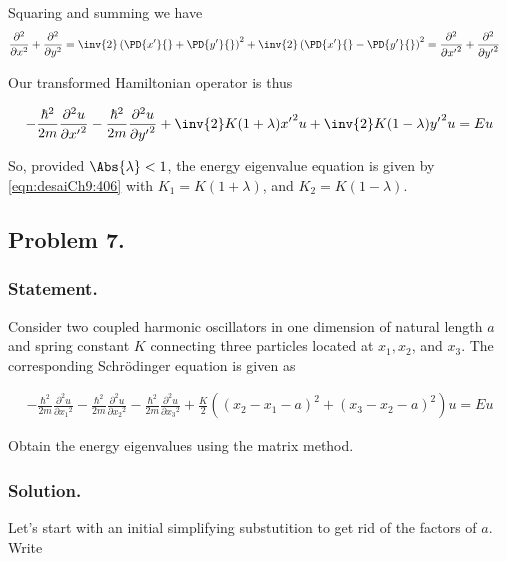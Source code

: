 Squaring and summing we have
\begin{align}\label{eqn:desaiCh9:505}
\frac{\partial^2}{\partial x^2} +
\frac{\partial^2}{\partial y^2}
&=
\inv{2} \left( \PD{x'}{} + \PD{y'}{} \right)^2
+\inv{2} \left( \PD{x'}{} - \PD{y'}{} \right)^2
=
\frac{\partial^2}{\partial {x'}^2} +
\frac{\partial^2}{\partial {y'}^2}
\end{align}

Our transformed Hamiltonian operator is thus

\begin{align}\label{eqn:desaiCh9:506}
-\frac{\hbar^2}{2m} \frac{\partial^2 u}{\partial {x'}^2}
-\frac{\hbar^2}{2m} \frac{\partial^2 u}{\partial {y'}^2}
+ \inv{2} K(1+\lambda) {x'}^2 u
+ \inv{2} K(1-\lambda) {y'}^2 u
= E u
\end{align}

So, provided $\Abs{\lambda} < 1$, the energy eigenvalue equation is given by \ref{eqn:desaiCh9:406} with $K_1 = K(1+ \lambda)$, and $K_2 = K(1 -\lambda)$.

\subsection{Problem 7.}
\subsubsection{Statement.}

Consider two coupled harmonic oscillators in one dimension of natural length $a$ and spring constant $K$ connecting three particles located at $x_1, x_2$, and $x_3$.  The corresponding Schr\"{o}dinger equation is given as

\begin{align}\label{eqn:desaiCh9:700}
-\frac{\hbar^2}{2m} \frac{\partial^2 u}{\partial {x_1}^2}
-\frac{\hbar^2}{2m} \frac{\partial^2 u}{\partial {x_2}^2}
-\frac{\hbar^2}{2m} \frac{\partial^2 u}{\partial {x_3}^2}
+ \frac{K}{2}
\left(
(x_2 - x_1 - a)^2
+(x_3 - x_2 - a)^2
\right) u
= E u
\end{align}

Obtain the energy eigenvalues using the matrix method.

\subsubsection{Solution.}

Let's start with an initial simplifying substutition to get rid of the factors of $a$.  Write

